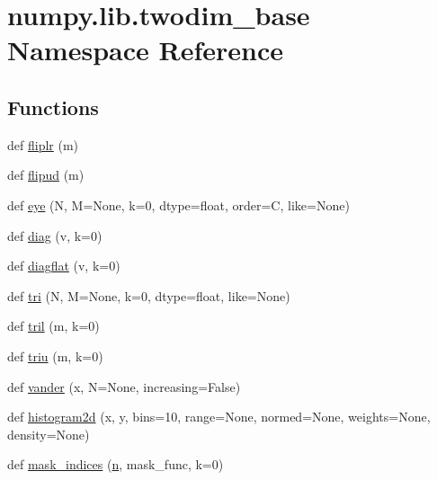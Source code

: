 \hypertarget{namespacenumpy_1_1lib_1_1twodim__base}{}\section{numpy.\+lib.\+twodim\+\_\+base Namespace Reference}
\label{namespacenumpy_1_1lib_1_1twodim__base}
\subsection*{Functions}
\begin{DoxyCompactItemize}
\item 
def \hyperlink{namespacenumpy_1_1lib_1_1twodim__base_a2f41aaea32e91fb7452fae3c58927b1f}{fliplr} (m)
\item 
def \hyperlink{namespacenumpy_1_1lib_1_1twodim__base_a33ed22c6334be41a34f97257be3ff2ed}{flipud} (m)
\item 
def \hyperlink{namespacenumpy_1_1lib_1_1twodim__base_a7a0b29351e4930dbb6ad06d35256e59b}{eye} (N, M=None, k=0, dtype=float, order=\textquotesingle{}C\textquotesingle{}, like=None)
\item 
def \hyperlink{namespacenumpy_1_1lib_1_1twodim__base_ab5c9fa6bbfe9e559e90c311d320b49f3}{diag} (v, k=0)
\item 
def \hyperlink{namespacenumpy_1_1lib_1_1twodim__base_a2e76d5ad9a99bf0dfbc11ec1eec8a733}{diagflat} (v, k=0)
\item 
def \hyperlink{namespacenumpy_1_1lib_1_1twodim__base_a5e4ae28b8ab99d6def80add7515108ff}{tri} (N, M=None, k=0, dtype=float, like=None)
\item 
def \hyperlink{namespacenumpy_1_1lib_1_1twodim__base_a25994ec2771961d49aa773b59f6d8674}{tril} (m, k=0)
\item 
def \hyperlink{namespacenumpy_1_1lib_1_1twodim__base_ad4c5f72467e0719ef3b6e8e9a1aad2cd}{triu} (m, k=0)
\item 
def \hyperlink{namespacenumpy_1_1lib_1_1twodim__base_a2aaf8cbe0cc568d958fd0ec603b94677}{vander} (x, N=None, increasing=False)
\item 
def \hyperlink{namespacenumpy_1_1lib_1_1twodim__base_a890a4b6f905191422798139ce511849a}{histogram2d} (x, y, bins=10, range=None, normed=None, weights=None, density=None)
\item 
def \hyperlink{namespacenumpy_1_1lib_1_1twodim__base_a1475cbe0d8625d39a2e2a3b91dc0a44f}{mask\+\_\+indices} (\hyperlink{namespacenumpy_a352663c52853d2754274407d5cae2832}{n}, mask\+\_\+func, k=0)
\item 

\end{DoxyCompactItemize}
